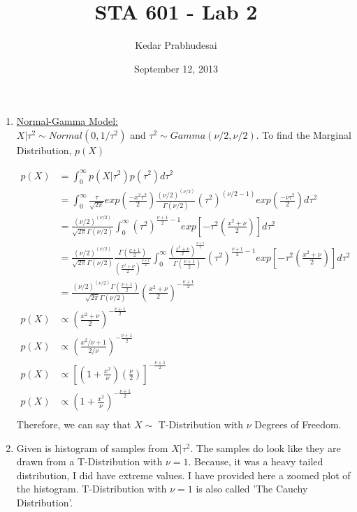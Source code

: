 \documentclass{article}
\title{STA 601 - Lab 2}
\author{Kedar Prabhudesai}
\date{September 12, 2013}
\begin{document}
\maketitle

\begin{enumerate}
\item \underline{Normal-Gamma Model:}\\

$X|\tau^2 \sim Normal(0,1/\tau^2)$ and $\tau^2 \sim Gamma(\nu/2,\nu/2).$ To find the Marginal Distribution, $p(X)$

\begin{align*}
p(X) &= \int_{0}^{\infty} p(X|\tau^2)p(\tau^2)d\tau^2\\
		 &= \int_{0}^{\infty} \frac{\tau}{\sqrt{2\pi}} exp\left(\frac{-x^2\tau^2}{2}\right) \frac{(\nu/2)^{(\nu/2)}}{\Gamma(\nu/2)} (\tau^2)^{(\nu/2-1)} exp\left(\frac{-\nu\tau^2}{2}\right)d\tau^2\\
		 &= \frac{(\nu/2)^{(\nu/2)}}{\sqrt{2\pi}\Gamma(\nu/2)} \int_{0}^{\infty} \left(\tau^2\right)^{\frac{\nu+1}{2}-1} exp\left[-\tau^2\left(\frac{x^2+\nu}{2}\right)\right] d\tau^2\\
		 &= \frac{(\nu/2)^{(\nu/2)}}{\sqrt{2\pi}\Gamma(\nu/2)} \frac{\Gamma(\frac{\nu+1}{2})}{\left( \frac{x^2+\nu}{2}\right)^{\frac{\nu+1}{2}}} \int_{0}^{\infty} \frac{\left( \frac{x^2+\nu}{2}\right)^{\frac{\nu+1}{2}}}{\Gamma(\frac{\nu+1}{2})} \left(\tau^2\right)^{\frac{\nu+1}{2}-1} exp\left[-\tau^2\left(\frac{x^2+\nu}{2}\right)\right] d\tau^2\\
		 &= \frac{(\nu/2)^{(\nu/2)}\Gamma(\frac{\nu+1}{2})}{\sqrt{2\pi}\Gamma(\nu/2)} \left( \frac{x^2+\nu}{2}\right)^{-\frac{\nu+1}{2}}\\ 
p(X) &\propto \left( \frac{x^2+\nu}{2}\right)^{-\frac{\nu+1}{2}}\\
p(X) &\propto \left( \frac{x^2/\nu+1}{2/\nu}\right)^{-\frac{\nu+1}{2}}\\
p(X) &\propto \left[ \left(1+\frac{x^2}{\nu}\right) \left(\frac{\nu}{2}\right)\right]^{-\frac{\nu+1}{2}}\\
p(X) &\propto \left(1+\frac{x^2}{\nu}\right)^{-\frac{\nu+1}{2}}\\
\end{align*}
\noindent Therefore, we can say that $X\sim$ T-Distribution with $\nu$ Degrees of Freedom.

\pagebreak
\item Given is histogram of samples from $X|\tau^2.$ The samples do look like they are drawn from a T-Distribution with $\nu=1.$ Because, it was a heavy tailed distribution, I did have extreme values. I have provided here a zoomed plot of the histogram. T-Distribution with $\nu=1$ is also called 'The Cauchy Distribution'.\\


\end{enumerate}
\end{document}
